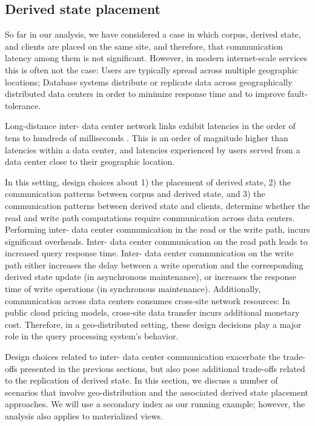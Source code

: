 \subsection{Derived state placement}
\label{sec:topology_patterns}


So far in our analysis,
we have considered a case in which corpus, derived state, and clients are placed on the same site,
and therefore, that communication latency among them is not significant.
However, in modern internet-scale services this is often not the case:
Users are typically spread across multiple geographic locations;
Database systems distribute or replicate data across geographically distributed data centers
in order to minimize response time and to improve fault-tolerance.

Long-distance inter- data center network links exhibit latencies in the order of tens to hundreds of milliseconds \cite{pbailis:hats}.
This is an order of magnitude higher than latencies within a data center,
and latencies experienced by users served from a data center close to their geographic location.

In this setting, design choices about 1) the placement of derived state,
2) the communication patterns between corpus and derived state, and 3) the communication patterns between derived state and clients,
determine whether the read and write path computations require communication across data centers.
Performing inter- data center communication in the read or the write path,
incurs significant overheads.
Inter- data center communication on the read path leads to increased query response time.
Inter- data center communication on the write path either increases the delay between a write operation and the corresponding
derived state update (in asynchronous maintenance),
or increases the response time of write operations (in synchronous maintenance).
Additionally, communication across data centers consumes cross-site network resources:
In public cloud pricing models, cross-site data transfer incurs additional monetary cost.
Therefore, in a geo-distributed setting,
these design decisions play a major role in the query processing system's behavior.

Design choices related to inter- data center communication exacerbate the trade-offs presented in the previous sections,
but also pose additional trade-offs related to the replication of derived state.
In this section, we discuss a number of scenarios that involve geo-distribution and the associated derived state placement approaches.
We will use a secondary index as our running example; however, the analysis also applies to materialized views.

